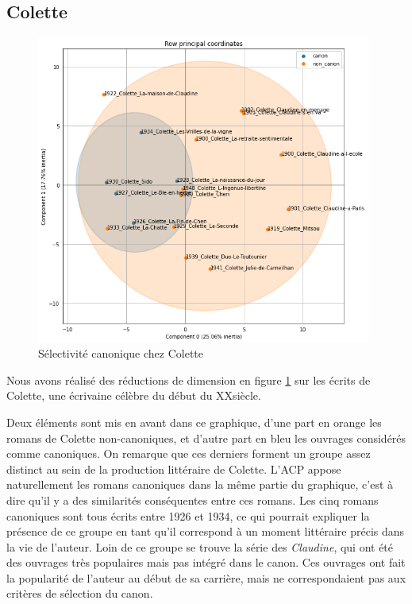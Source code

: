 \subsection{Colette}

\bigskip
\begin{figure}[!ht]
    \centering
    \includegraphics[width=11cm]{img/15_pca_Colette.png}
    \caption{Sélectivité canonique chez Colette}
    \label{colette}
\end{figure}

Nous avons réalisé des réductions de dimension en figure \ref{colette} sur les écrits de Colette, une écrivaine célèbre du début du XX\ieme siècle. 

Deux éléments sont mis en avant dans ce graphique, d'une part en orange les romans de Colette non-canoniques, et d'autre part en bleu les ouvrages considérés comme canoniques. On remarque que ces derniers forment un groupe assez distinct au sein de la production littéraire de Colette. L'ACP appose naturellement les romans canoniques dans la même partie du graphique, c'est à dire qu'il y a des similarités conséquentes entre ces romans. Les cinq romans canoniques sont tous écrits entre 1926 et 1934, ce qui pourrait expliquer la présence de ce groupe en tant qu'il correspond à un moment littéraire précis dans la vie de l'auteur. Loin de ce groupe se trouve la série des \textit{Claudine}, qui ont été des ouvrages très populaires mais pas intégré dans le canon. Ces ouvrages ont fait la popularité de l'auteur au début de sa carrière, mais ne correspondaient pas aux critères de sélection du canon. 


